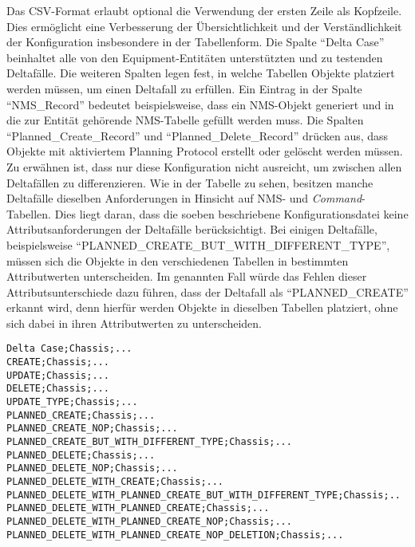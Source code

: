 Das \ac{CSV}-Format erlaubt optional die Verwendung der ersten Zeile als Kopfzeile. Dies ermöglicht eine Verbesserung der Übersichtlichkeit und der Verständlichkeit der Konfiguration insbesondere in der Tabellenform. Die Spalte \enquote{Delta Case} beinhaltet alle von den Equipment-Entitäten unterstützten und zu testenden Deltafälle. Die weiteren Spalten legen fest, in welche Tabellen Objekte platziert werden müssen, um einen Deltafall zu erfüllen. Ein Eintrag in der Spalte \enquote{NMS\_Record} bedeutet beispielsweise, dass ein \ac{NMS}-Objekt generiert und in die zur Entität gehörende \ac{NMS}-Tabelle gefüllt werden muss. Die Spalten \enquote{Planned\_Create\_Record} und \enquote{Planned\_Delete\_Record} drücken aus, dass Objekte mit aktiviertem Planning Protocol erstellt oder gelöscht werden müssen. Zu erwähnen ist, dass nur diese Konfiguration nicht ausreicht, um zwischen allen Deltafällen zu differenzieren. Wie in der Tabelle zu sehen, besitzen manche Deltafälle dieselben Anforderungen in Hinsicht auf \ac{NMS}- und \textit{Command}-Tabellen. Dies liegt daran, dass die soeben beschriebene Konfigurationsdatei keine Attributsanforderungen der Deltafälle berücksichtigt. Bei einigen Deltafälle, beispielsweise \enquote{PLANNED\_CREATE\_BUT\_WITH\_DIFFERENT\_TYPE}, müssen sich die Objekte in den verschiedenen Tabellen in bestimmten Attributwerten unterscheiden. Im genannten Fall würde das Fehlen dieser Attributsunterschiede dazu führen, dass der Deltafall als \enquote{PLANNED\_CREATE} erkannt wird, denn hierfür werden Objekte in dieselben Tabellen platziert, ohne sich dabei in ihren Attributwerten zu unterscheiden.

\newpage
\begin{lstlisting}[caption=Konfigurationsdatei für Entitäten im CSV-Format, label=entityConfig,language=csv,basicstyle=\footnotesize\ttfamily]
Delta Case;Chassis;...
CREATE;Chassis;...
UPDATE;Chassis;...
DELETE;Chassis;...
UPDATE_TYPE;Chassis;...
PLANNED_CREATE;Chassis;...
PLANNED_CREATE_NOP;Chassis;...
PLANNED_CREATE_BUT_WITH_DIFFERENT_TYPE;Chassis;...
PLANNED_DELETE;Chassis;...
PLANNED_DELETE_NOP;Chassis;...
PLANNED_DELETE_WITH_CREATE;Chassis;...
PLANNED_DELETE_WITH_PLANNED_CREATE_BUT_WITH_DIFFERENT_TYPE;Chassis;..
PLANNED_DELETE_WITH_PLANNED_CREATE;Chassis;...
PLANNED_DELETE_WITH_PLANNED_CREATE_NOP;Chassis;...
PLANNED_DELETE_WITH_PLANNED_CREATE_NOP_DELETION;Chassis;...
\end{lstlisting}

